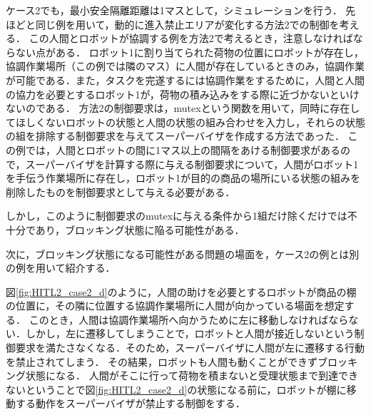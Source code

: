 ケース2でも，最小安全隔離距離は1マスとして，シミュレーションを行う．
先ほどと同じ例を用いて，動的に進入禁止エリアが変化する方法2での制御を考える．
この人間とロボットが協調する例を方法2で考えるとき，注意しなければならない点がある．
ロボット1に割り当てられた荷物の位置にロボットが存在し，協調作業場所（この例では隣のマス）に人間が存在しているときのみ，協調作業が可能である．また，タスクを完遂するには協調作業をするために，人間と人間の協力を必要とするロボット1が，荷物の積み込みをする際に近づかないといけないのである．
方法2の制御要求は，mutexという関数を用いて，同時に存在してほしくないロボットの状態と人間の状態の組み合わせを入力し，それらの状態の組を排除する制御要求を与えてスーパーバイザを作成する方法であった．
この例では，人間とロボットの間に1マス以上の間隔をあける制御要求があるので，スーパーバイザを計算する際に与える制御要求について，人間がロボット1を手伝う作業場所に存在し，ロボット1が目的の商品の場所にいる状態の組みを削除したものを制御要求として与える必要がある．


しかし，このように制御要求のmutexに与える条件から1組だけ除くだけでは不十分であり，ブロッキング状態に陥る可能性がある．

次に，ブロッキング状態になる可能性がある問題の場面を，ケース2の例とは別の例を用いて紹介する．

図\ref{fig:HITL2_case2_d}のように，人間の助けを必要とするロボットが商品の棚の位置に，その隣に位置する協調作業場所に人間が向かっている場面を想定する．
このとき，人間は協調作業場所へ向かうために左に移動しなければならない．しかし，左に遷移してしまうことで，ロボットと人間が接近しないという制御要求を満たさなくなる．そのため，スーパーバイザに人間が左に遷移する行動を禁止されてしまう．
その結果，ロボットも人間も動くことができずブロッキング状態になる．
人間がそこに行って荷物を積まないと受理状態まで到達できないということで図\ref{fig:HITL2_case2_d}の状態になる前に，ロボットが棚に移動する動作をスーパーバイザが禁止する制御をする．

